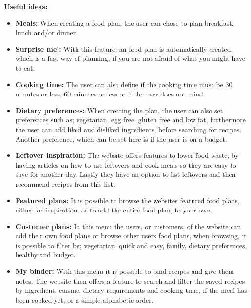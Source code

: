 \textbf{Useful ideas:}
\begin{itemize}
  \item \textbf{Meals:} When creating a food plan, the user can chose to plan breakfast, lunch and/or dinner.
  \item \textbf{Surprise me!:} With this feature, an food plan is automatically created, which is a fast way of planning, if you are not afraid of what you might have to eat.
  \item \textbf{Cooking time:} The user can also define if the cooking time must be 30 minutes or less, 60 minutes or less or if the user does not mind.
  \item \textbf{Dietary preferences:} When creating the plan, the user can also set preferences such as; vegetarian, egg free, gluten free and low fat, furthermore the user can add liked and disliked ingredients, before searching for recipes. Another preference, which can be set here is if the user is on a budget.
  \item \textbf{Leftover inspiration:} The website offers features to lower food waste, by having articles on how to use leftovers and cook meals so they are easy to save for another day. Lastly they have an option to list leftovers and then recommend recipes from this list.
  \item \textbf{Featured plans:} It is possible to browse the websites featured food plans, either for inspiration, or to add the entire food plan, to your own.
  \item \textbf{Customer plans:} In this menu the users, or customers, of the website can add their own food plans or browse other users food plans, when browsing, it is possible to filter by; vegetarian, quick and easy, family, dietary preferences, healthy and budget.
  \item \textbf{My binder:} With this menu it is possible to bind recipes and give them notes. The website then offers a feature to search and filter the saved recipes by ingredient, cuisine, dietary requirements and cooking time, if the meal has been cooked yet, or a simple alphabetic order.
\end{itemize}

